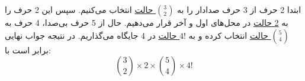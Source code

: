 \p
    ابتدا 2 حرف از 3 حرف صدادار را به 
    \underline{${3\choose 2}$ حالت}
    انتخاب می‌کنیم. سپس این 2 حرف را به 
    \underline{2 حالت}
     در محل‌های اول و آخر قرار می‌دهیم.
    حال از 5 حرف بی‌صدا، 4 حرف به 
    \underline{${5\choose 4}$ حالت}
    انتخاب کرده و به 
    \underline{$4!$ حالت}
    در 4 جایگاه می‌گذاریم.
    در نتیجه جواب نهایی برابر است با:
    $${3\choose 2} \times 2 \times {5\choose 4} \times 4!$$

